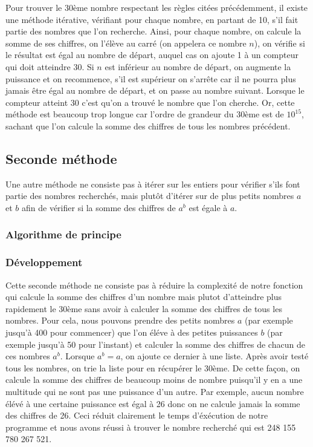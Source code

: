 \documentclass{article}
\begin{document}
Pour trouver le 30ème nombre respectant les règles citées précédemment, il existe une méthode itérative, vérifiant pour chaque nombre, en partant de 10, s'il fait partie des nombres que l'on recherche. Ainsi, pour chaque nombre, on calcule la somme de ses chiffres, on l'élève au carré (on appelera ce nombre $n$), on vérifie si le résultat est égal au nombre de départ, auquel cas on ajoute 1 à un compteur qui doit atteindre 30. Si $n$ est inférieur au nombre de départ, on augmente la puissance et on recommence, s'il est supérieur on s'arrête car il ne pourra plus jamais être égal au nombre de départ, et on passe au nombre suivant. Lorsque le compteur atteint 30 c'est qu'on a trouvé le nombre que l'on cherche. Or, cette méthode est beaucoup trop longue car l'ordre de grandeur du 30ème est de $10^{15}$, sachant que l'on calcule la somme des chiffres de tous les nombres précédent.


\subsection{Seconde méthode}
Une autre méthode ne consiste pas à itérer sur les entiers pour vérifier s'ils font partie des nombres recherchés, mais plutôt d'itérer sur de plus petits nombres $a$ et $b$ afin de vérifier si la somme des chiffres de $a^{b}$ est égale à $a$.
\subsubsection{Algorithme de principe}


\subsubsection{Développement}
Cette seconde méthode ne consiste pas à réduire la complexité de notre fonction qui calcule la somme des chiffres d'un nombre mais plutot d'atteindre plus rapidement le 30ème sans avoir à calculer la somme des chiffres de tous les nombres. Pour cela, nous pouvons prendre des petits nombres $a$ (par exemple jusqu'à 400 pour commencer) que l'on éléve à des petites puissances $b$ (par exemple jusqu'à 50 pour l'instant) et calculer la somme des chiffres de chacun de ces nombres $a^{b}$. Lorsque $a^{b} = a$, on ajoute ce dernier à une liste. Après avoir testé tous les nombres, on trie la liste pour en récupérer le 30ème. De cette façon, on calcule la somme des chiffres de beaucoup moins de nombre puisqu'il y en a une multitude qui ne sont pas une puissance d'un autre. Par exemple, aucun nombre élévé à une certaine puissance est égal à 26 donc on ne calcule jamais la somme des chiffres de 26. Ceci réduit clairement le temps d'éxécution de notre programme et nous avons réussi à trouver le nombre recherché qui est 248 155 780 267 521.
\end{document}
